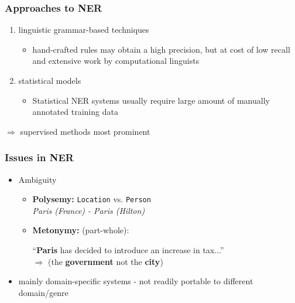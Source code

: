 \documentclass[10pt]{beamer}
\begin{document}
 


\begin{frame}
\frametitle{Approaches to NER}

\begin{enumerate}
 \item linguistic grammar-based techniques
\begin{itemize}
	\item hand-crafted rules may obtain a high precision, but at cost of low recall
	and extensive work by computational linguists
\end{itemize}

 \item statistical models
\begin{itemize}
	\item Statistical NER systems usually require large amount of manually annotated training data
\end{itemize}
\end{enumerate}

$\Rightarrow$ supervised methods most prominent


\end{frame}


\begin{frame}
\frametitle{Issues in NER}


\begin{itemize}
 \item Ambiguity


\begin{itemize}
 \item \textbf{Polysemy:} \texttt{Location} vs. \texttt{Person} \\
 
 \emph{Paris (France) - Paris (Hilton)}\\
 
 \item \textbf{Metonymy:}  (part-whole):
 
 ``\textbf{Paris} has decided to introduce an increase in tax...'' \\
 
 $\Rightarrow$ (the \textbf{government} not the \textbf{city})  
\end{itemize}

 \item mainly domain-specific systems - not readily portable to different domain/genre %
 
\end{itemize}

\end{frame}
\end{document}
